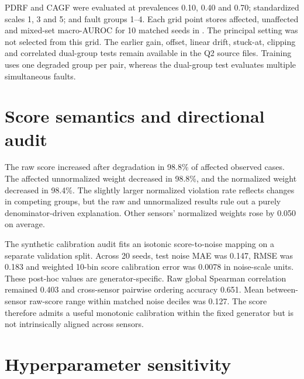 \documentclass[10pt]{article}
\begin{document}
\begin{table}[ht]
\centering
\caption{Mild-versus-formal severity audit on the strict subset. Values are equal-weight means over four controlled mechanisms and 10 fitted endpoint pairs. $U/10^4$ uses equal correction and harm values and no pass penalty.}
\label{tab:supp-severity-comparison}
\resizebox{0.94\textwidth}{!}{}
\end{table}

PDRF and CAGF were evaluated at prevalences 0.10, 0.40 and 0.70; standardized scales 1, 3 and 5; and fault groups 1--4. Each grid point stores affected, unaffected and mixed-set macro-AUROC for 10 matched seeds in . The principal setting was not selected from this grid. The earlier gain, offset, linear drift, stuck-at, clipping and correlated dual-group tests remain available in the Q2 source files. Training uses one degraded group per pair, whereas the dual-group test evaluates multiple simultaneous faults.

\section{Score semantics and directional audit}

The raw score increased after degradation in 98.8\% of affected observed cases. The affected unnormalized weight decreased in 98.8\%, and the normalized weight decreased in 98.4\%. The slightly larger normalized violation rate reflects changes in competing groups, but the raw and unnormalized results rule out a purely denominator-driven explanation. Other sensors' normalized weights rose by 0.050 on average.

The synthetic calibration audit fits an isotonic score-to-noise mapping on a separate validation split. Across 20 seeds, test noise MAE was 0.147, RMSE was 0.183 and weighted 10-bin score calibration error was 0.0078 in noise-scale units. These post-hoc values are generator-specific. Raw global Spearman correlation remained 0.403 and cross-sensor pairwise ordering accuracy 0.651. Mean between-sensor raw-score range within matched noise deciles was 0.127. The score therefore admits a useful monotonic calibration within the fixed generator but is not intrinsically aligned across sensors.

\section{Hyperparameter sensitivity}
\end{document}
